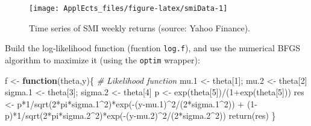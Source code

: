 \documentclass[
  12pt,
]{book}
\newenvironment{Shaded}{\begin{snugshade}}{\end{snugshade}}
\newcommand{\CommentTok}[1]{\textcolor[rgb]{0.56,0.35,0.01}{\textit{#1}}}
\newcommand{\ControlFlowTok}[1]{\textcolor[rgb]{0.13,0.29,0.53}{\textbf{#1}}}
\newcommand{\DecValTok}[1]{\textcolor[rgb]{0.00,0.00,0.81}{#1}}
\newcommand{\FloatTok}[1]{\textcolor[rgb]{0.00,0.00,0.81}{#1}}
\newcommand{\FunctionTok}[1]{\textcolor[rgb]{0.00,0.00,0.00}{#1}}
\newcommand{\NormalTok}[1]{#1}
\newcommand{\OtherTok}[1]{\textcolor[rgb]{0.56,0.35,0.01}{#1}}
\newcommand{\SpecialCharTok}[1]{\textcolor[rgb]{0.00,0.00,0.00}{#1}}
\theoremstyle{definition}
\theoremstyle{definition}
\theoremstyle{definition}
\theoremstyle{definition}
\theoremstyle{remark}
\begin{document}
\begin{figure}
\texttt{[image: ApplEcts\_files/figure-latex/smiData-1]} \caption{Time series of SMI weekly returns (source: Yahoo Finance).}\label{fig:smiData}
\end{figure}

Build the log-likelihood function (fucntion \texttt{log.f}), and use the numerical BFGS algorithm to maximize it (using the \texttt{optim} wrapper):

\begin{Shaded}
\begin{Highlighting}[]
\NormalTok{f }\OtherTok{\textless{}{-}} \ControlFlowTok{function}\NormalTok{(theta,y)\{ }\CommentTok{\# Likelihood function}
\NormalTok{  mu}\FloatTok{.1} \OtherTok{\textless{}{-}}\NormalTok{ theta[}\DecValTok{1}\NormalTok{]; mu}\FloatTok{.2} \OtherTok{\textless{}{-}}\NormalTok{ theta[}\DecValTok{2}\NormalTok{]}
\NormalTok{  sigma}\FloatTok{.1} \OtherTok{\textless{}{-}}\NormalTok{ theta[}\DecValTok{3}\NormalTok{]; sigma}\FloatTok{.2} \OtherTok{\textless{}{-}}\NormalTok{ theta[}\DecValTok{4}\NormalTok{]}
\NormalTok{  p }\OtherTok{\textless{}{-}} \FunctionTok{exp}\NormalTok{(theta[}\DecValTok{5}\NormalTok{])}\SpecialCharTok{/}\NormalTok{(}\DecValTok{1}\SpecialCharTok{+}\FunctionTok{exp}\NormalTok{(theta[}\DecValTok{5}\NormalTok{]))}
\NormalTok{  res }\OtherTok{\textless{}{-}}\NormalTok{ p}\SpecialCharTok{*}\DecValTok{1}\SpecialCharTok{/}\FunctionTok{sqrt}\NormalTok{(}\DecValTok{2}\SpecialCharTok{*}\NormalTok{pi}\SpecialCharTok{*}\NormalTok{sigma}\FloatTok{.1}\SpecialCharTok{\^{}}\DecValTok{2}\NormalTok{)}\SpecialCharTok{*}\FunctionTok{exp}\NormalTok{(}\SpecialCharTok{{-}}\NormalTok{(y}\SpecialCharTok{{-}}\NormalTok{mu}\FloatTok{.1}\NormalTok{)}\SpecialCharTok{\^{}}\DecValTok{2}\SpecialCharTok{/}\NormalTok{(}\DecValTok{2}\SpecialCharTok{*}\NormalTok{sigma}\FloatTok{.1}\SpecialCharTok{\^{}}\DecValTok{2}\NormalTok{)) }\SpecialCharTok{+}
\NormalTok{    (}\DecValTok{1}\SpecialCharTok{{-}}\NormalTok{p)}\SpecialCharTok{*}\DecValTok{1}\SpecialCharTok{/}\FunctionTok{sqrt}\NormalTok{(}\DecValTok{2}\SpecialCharTok{*}\NormalTok{pi}\SpecialCharTok{*}\NormalTok{sigma}\FloatTok{.2}\SpecialCharTok{\^{}}\DecValTok{2}\NormalTok{)}\SpecialCharTok{*}\FunctionTok{exp}\NormalTok{(}\SpecialCharTok{{-}}\NormalTok{(y}\SpecialCharTok{{-}}\NormalTok{mu}\FloatTok{.2}\NormalTok{)}\SpecialCharTok{\^{}}\DecValTok{2}\SpecialCharTok{/}\NormalTok{(}\DecValTok{2}\SpecialCharTok{*}\NormalTok{sigma}\FloatTok{.2}\SpecialCharTok{\^{}}\DecValTok{2}\NormalTok{))}
  \FunctionTok{return}\NormalTok{(res)}
\NormalTok{\}}

\end{Highlighting}
\end{Shaded}
\end{document}
